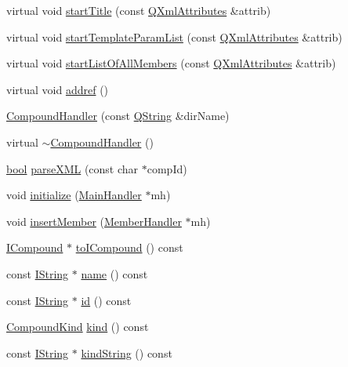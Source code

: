 \begin{DoxyCompactItemize}
\item 
virtual void \hyperlink{class_compound_handler_a6a9c0f1427deca9d29aa96a746543eba}{start\+Title} (const \hyperlink{class_q_xml_attributes}{Q\+Xml\+Attributes} \&attrib)
\item 
virtual void \hyperlink{class_compound_handler_ab22159348e5da740cde39d18a2b12bcb}{start\+Template\+Param\+List} (const \hyperlink{class_q_xml_attributes}{Q\+Xml\+Attributes} \&attrib)
\item 
virtual void \hyperlink{class_compound_handler_a56e1ac1a5207ad99998c3d3b4aadca6e}{start\+List\+Of\+All\+Members} (const \hyperlink{class_q_xml_attributes}{Q\+Xml\+Attributes} \&attrib)
\item 
virtual void \hyperlink{class_compound_handler_a563d4e83ce0163c67c4091c9768c0bb8}{addref} ()
\item 
\hyperlink{class_compound_handler_a8a94140e1979869bb0690db66aa1e044}{Compound\+Handler} (const \hyperlink{class_q_string}{Q\+String} \&dir\+Name)
\item 
virtual \hyperlink{class_compound_handler_a0257ebf632b1cf14ebed8d6283e976a6}{$\sim$\+Compound\+Handler} ()
\item 
\hyperlink{qglobal_8h_a1062901a7428fdd9c7f180f5e01ea056}{bool} \hyperlink{class_compound_handler_a66b14cb056961d82e31bb6899e77d4a2}{parse\+X\+M\+L} (const char $\ast$comp\+Id)
\item 
void \hyperlink{class_compound_handler_a75adcf396f6b32137d69634f4edb48ad}{initialize} (\hyperlink{class_main_handler}{Main\+Handler} $\ast$mh)
\item 
void \hyperlink{class_compound_handler_aa7418eb982356d814331f41ec1290bbd}{insert\+Member} (\hyperlink{class_member_handler}{Member\+Handler} $\ast$mh)
\item 
\hyperlink{class_i_compound}{I\+Compound} $\ast$ \hyperlink{class_compound_handler_aaac8a7f24012aab18d92169c4ebd7596}{to\+I\+Compound} () const 
\item 
const \hyperlink{class_i_string}{I\+String} $\ast$ \hyperlink{class_compound_handler_a3e64bb10353a10cbd873ea98a9471f98}{name} () const 
\item 
const \hyperlink{class_i_string}{I\+String} $\ast$ \hyperlink{class_compound_handler_ae032b7d586f91004a51e315d7d40b482}{id} () const 
\item 
\hyperlink{class_i_compound_a6b86be2ca9f6759434c1dd8405be328a}{Compound\+Kind} \hyperlink{class_compound_handler_a8e75dd580519accfe788e3d140924317}{kind} () const 
\item 
const \hyperlink{class_i_string}{I\+String} $\ast$ \hyperlink{class_compound_handler_a2aaf507a5d73a6b8cdbc883a6b701149}{kind\+String} () const 

\end{DoxyCompactItemize}

